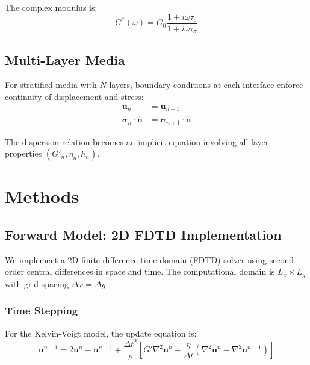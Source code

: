\documentclass[journal,twoside,a4paper]{IEEEtran}
\begin{document}
The complex modulus is:
\begin{equation}
    G^*(\omega) = G_0 \frac{1 + i\omega\tau_\varepsilon}{1 + i\omega\tau_\sigma}
    \label{eq:zener_complex}
\end{equation}

\subsection{Multi-Layer Media}

For stratified media with $N$ layers, boundary conditions at each 
interface enforce continuity of displacement and stress:
\begin{align}
    \mathbf{u}_n &= \mathbf{u}_{n+1} \\
    \boldsymbol{\sigma}_n \cdot \hat{\mathbf{n}} &= \boldsymbol{\sigma}_{n+1} \cdot \hat{\mathbf{n}}
\end{align}

The dispersion relation becomes an implicit equation involving all 
layer properties $(G'_n, \eta_n, h_n)$.

\section{Methods}
\label{sec:methods}

\subsection{Forward Model: 2D FDTD Implementation}

We implement a 2D finite-difference time-domain (FDTD) solver using 
second-order central differences in space and time. The computational 
domain is $L_x \times L_y$ with grid spacing $\Delta x = \Delta y$.

\subsubsection{Time Stepping}

For the Kelvin-Voigt model, the update equation is:
\begin{equation}
    \mathbf{u}^{n+1} = 2\mathbf{u}^n - \mathbf{u}^{n-1} + \frac{\Delta t^2}{\rho}\left[G'\nabla^2\mathbf{u}^n + \frac{\eta}{\Delta t}(\nabla^2\mathbf{u}^n - \nabla^2\mathbf{u}^{n-1})\right]
\end{equation}
\end{document}
